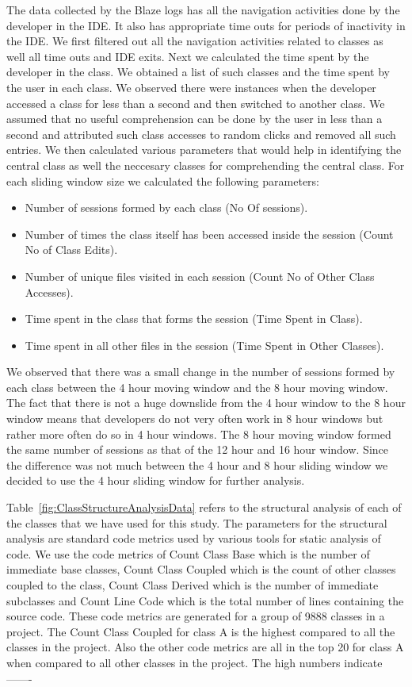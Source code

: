 The data collected by the Blaze logs has all the navigation activities done by the developer in the IDE. It also has appropriate time outs for periods of inactivity in the IDE. We first filtered out all the navigation activities related to classes as well all time outs and IDE exits. Next we calculated the time spent by the developer in the class. We obtained a list of such classes and the time spent by the user in each class. We observed there were instances when the developer accessed a class for less than a second and then switched to another class. We assumed that no useful comprehension can be done by the user in less than a second and attributed such class accesses to random clicks and removed all such entries. We then calculated various parameters that would help in identifying the central class as well the neccesary classes for comprehending the central class. For each sliding window size we calculated the following parameters:
\begin{itemize}
	\item[] Number of sessions formed by each class (No Of sessions).
	\item[] Number of times the class itself has been accessed inside the session (Count No of Class Edits).
	\item[] Number of unique files visited in each session (Count No of Other Class Accesses).
	\item[] Time spent in the class that forms the session (Time Spent in Class).
	\item[] Time spent in all other files in the session (Time Spent in Other Classes). 
\end{itemize}
We observed that there was a small change in the number of sessions formed by each class between the 4 hour moving window and the 8 hour moving window. The fact that there is not a huge downslide from the 4 hour window to the 8 hour window means that developers do not very often work in 8 hour windows but rather more often do so in 4 hour windows. The 8 hour moving window formed the same number of sessions as that of the 12 hour and 16 hour window. Since the difference was not much between the 4 hour and 8 hour sliding window we decided to use the 4 hour sliding window for further analysis.

Table~\ref{fig:ClassStructureAnalysisData} refers to the structural analysis of each of the classes that we have used for this study. The parameters for the structural analysis are standard code metrics used by various tools for static analysis of code. We use the code metrics of Count Class Base which is the number of immediate base classes, Count Class Coupled which is the count of other classes coupled to the class, Count Class Derived which is the number of immediate subclasses and Count Line Code which is the total number of lines containing the source code. These code metrics are generated for a group of 9888 classes in a project. The Count Class Coupled for class A is the highest compared to all the classes in the project. Also the other code metrics are all in the top 20 for class A when compared to all other classes in the project. The high numbers indicate -------

